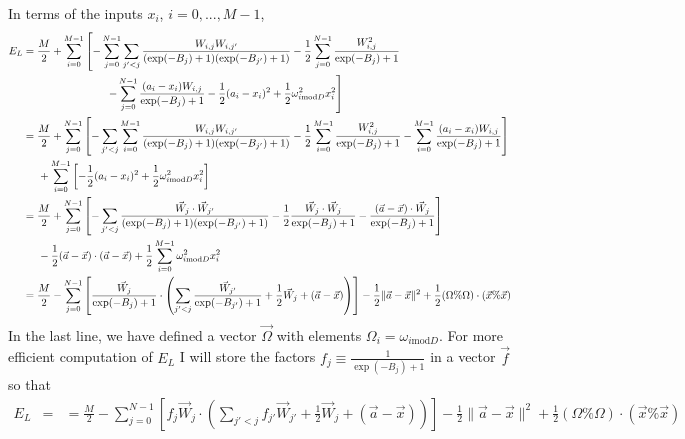 \documentclass[12pt]{article}
\begin{document}
In terms of the inputs $x_i$, $i = 0, ..., M-1$,
\begin{align*}
E_L &= \frac{M}{2} +\sum_{i=0}^{M-1} \left[ - \sum_{j=0}^{N-1} \sum_{j'<j} \frac{W_{i,j}W_{i,j'}}{(\exp(-B_j)+1)(\exp(-B_{j'})+1)}
-\frac{1}{2} \sum_{j=0}^{N-1} \frac{W_{i,j}^2}{\exp(-B_j)+1} \right.\\
&\hspace*{2.75cm} \left. -\sum_{j=0}^{N-1} \frac{(a_{i} -x_i ) W_{i,j}}{\exp(-B_j)+1} - \frac{1}{2} (a_{i}-x_i)^2 + \frac{1}{2} \omega_{i\text{mod}D}^2 x_i^2 \right]\\
&= \frac{M}{2} +\sum_{j=0}^{N-1} \left[ - \sum_{j'<j}\sum_{i=0}^{M-1} \frac{W_{i,j}W_{i,j'}}{(\exp(-B_j)+1)(\exp(-B_{j'})+1)}
-\frac{1}{2}\sum_{i=0}^{M-1} \frac{W_{i,j}^2}{\exp(-B_j)+1} - \sum_{i=0}^{M-1} \frac{(a_{i} -x_i ) W_{i,j}}{\exp(-B_j)+1}\right]\\
&\hspace*{.5cm}+\sum_{i=0}^{M-1} \left[ - \frac{1}{2} (a_{i}-x_i)^2 + \frac{1}{2} \omega_{i\text{mod}D}^2 x_i^2 \right]\\
&= \frac{M}{2} +\sum_{j=0}^{N-1} \left[ - \sum_{j'<j} \frac{\vec{W}_j\cdot \vec{W}_{j'}}{(\exp(-B_j)+1)(\exp(-B_{j'})+1)}
-\frac{1}{2} \frac{\vec{W}_j\cdot \vec{W}_j}{\exp(-B_j)+1} - \frac{(\vec{a}-\vec{x})\cdot \vec{W}_j }{\exp(-B_j)+1}\right]\\
&\hspace*{.5cm}  - \frac{1}{2} (\vec{a}-\vec{x}) \cdot (\vec{a}-\vec{x}) + \frac{1}{2}  \sum_{i=0}^{M-1}\omega_{i\text{mod}D}^2 x_i^2 \\
&= \frac{M}{2} -\sum_{j=0}^{N-1} \left[ \frac{\vec{W}_j}{\exp(-B_j)+1} \cdot \left( \sum_{j'<j} \frac{\vec{W}_{j'}}{\exp(-B_{j'})+1}
+\frac{1}{2} \vec{W}_j +(\vec{a}-\vec{x})\right) \right]  - \frac{1}{2} \| \vec{a}-\vec{x}\|^2 + \frac{1}{2} (\Omega \% \Omega)\cdot (\vec{x} \% \vec{x}) \\
\end{align*}
In the last line, we have defined a vector $\vec{\Omega}$ with elements $\Omega_i = \omega_{i\text{mod}D}$. For more efficient computation of $E_L$ I will store the factors $f_j\equiv \frac{1}{\exp(-B_j)+1}$ in a vector $\vec{f}$ so that
\begin{align*}
E_L &= &= \frac{M}{2} -\sum_{j=0}^{N-1} \left[ f_j\vec{W}_j\cdot \left( \sum_{j'<j} f_{j'}\vec{W}_{j'}
+\frac{1}{2} \vec{W}_j +(\vec{a}-\vec{x})\right) \right]  - \frac{1}{2} \| \vec{a}-\vec{x}\|^2 + \frac{1}{2} (\Omega \% \Omega)\cdot (\vec{x} \% \vec{x}) \\
\end{align*}
\end{document}

